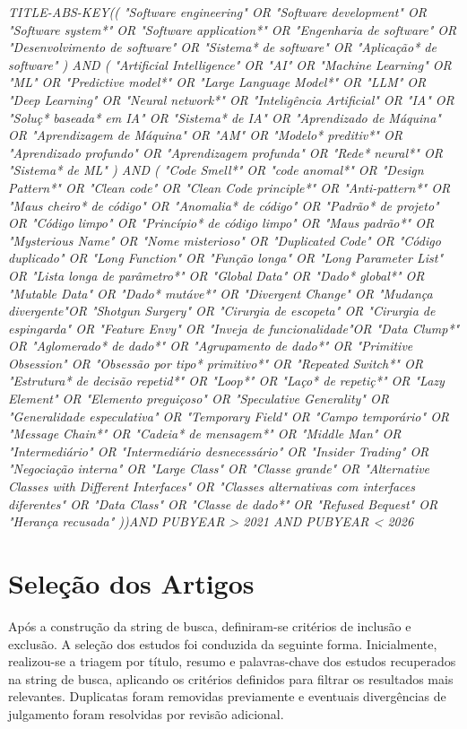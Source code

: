 \begin{center}
    \textit{TITLE-ABS-KEY(( "Software engineering" OR "Software development" OR "Software system*" OR "Software application*" OR "Engenharia de software" OR "Desenvolvimento de software" OR "Sistema* de software" OR "Aplicação* de software" ) AND ( "Artificial Intelligence" OR "AI" OR "Machine Learning" OR "ML" OR "Predictive model*" OR "Large Language Model*" OR "LLM" OR "Deep Learning" OR "Neural network*" OR "Inteligência Artificial" OR "IA" OR "Soluç* baseada* em IA" OR "Sistema* de IA" OR "Aprendizado de Máquina" OR "Aprendizagem de Máquina" OR "AM" OR "Modelo* preditiv*" OR "Aprendizado profundo" OR "Aprendizagem profunda" OR "Rede* neural*" OR "Sistema* de ML" ) AND ( "Code Smell*" OR "code anomal*" OR "Design Pattern*" OR "Clean code" OR "Clean Code principle*" OR "Anti-pattern*" OR "Maus cheiro* de código" OR "Anomalia* de código" OR "Padrão* de projeto" OR "Código limpo" OR "Princípio* de código limpo" OR "Maus padrão*" OR "Mysterious Name" OR "Nome misterioso" OR "Duplicated Code" OR "Código duplicado" OR "Long Function" OR "Função longa" OR "Long Parameter List" OR "Lista longa de parâmetro*" OR "Global Data" OR "Dado* global*" OR "Mutable Data" OR "Dado* mutáve*" OR "Divergent Change" OR "Mudança divergente"OR "Shotgun Surgery" OR "Cirurgia de escopeta" OR "Cirurgia de espingarda" OR "Feature Envy" OR "Inveja de funcionalidade"OR "Data Clump*" OR "Aglomerado* de dado*" OR "Agrupamento de dado*" OR "Primitive Obsession" OR "Obsessão por tipo* primitivo*" OR "Repeated Switch*" OR "Estrutura* de decisão repetid*" OR "Loop*" OR "Laço* de repetiç*" OR "Lazy Element" OR "Elemento preguiçoso" OR "Speculative Generality" OR "Generalidade especulativa" OR "Temporary Field" OR "Campo temporário" OR "Message Chain*" OR "Cadeia* de mensagem*" OR "Middle Man" OR "Intermediário" OR "Intermediário desnecessário" OR "Insider Trading" OR "Negociação interna" OR "Large Class" OR "Classe grande" OR "Alternative Classes with Different Interfaces" OR "Classes alternativas com interfaces diferentes" OR "Data Class" OR "Classe de dado*" OR "Refused Bequest" OR "Herança recusada" ))AND PUBYEAR > 2021 AND PUBYEAR < 2026}
\end{center}

\section{Seleção dos Artigos}

Após a construção da string de busca, definiram-se critérios de inclusão e exclusão. 
A seleção dos estudos foi conduzida da seguinte forma. Inicialmente, realizou-se a triagem por título, 
resumo e palavras-chave dos estudos recuperados na string de busca, aplicando os critérios definidos para 
filtrar os resultados mais relevantes. Duplicatas foram removidas previamente e 
eventuais divergências de julgamento foram resolvidas por revisão adicional.

